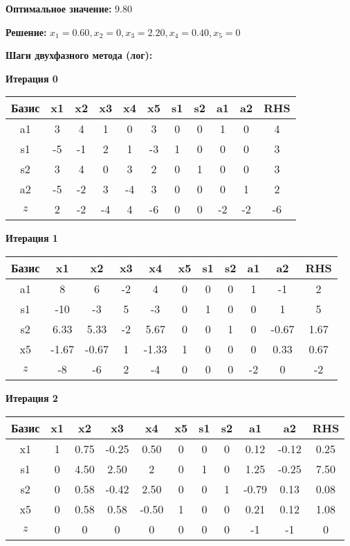 \documentclass[a4paper,12pt]{article}
\begin{document}
\textbf{Оптимальное значение: }$9.80$

\textbf{Решение: }$x_{1}=0.60, x_{2}=0, x_{3}=2.20, x_{4}=0.40, x_{5}=0$

\textbf{Шаги двухфазного метода (лог):}


 \textbf{Итерация 0}\\
\begin{tabular}{|c|c|c|c|c|c|c|c|c|c|c|}
\hline
Базис & x1 & x2 & x3 & x4 & x5 & s1 & s2 & a1 & a2 & RHS \\ \hline
a1 & 3 & 4 & 1 & 0 & 3 & 0 & 0 & 1 & 0 & 4 \\ \hline
s1 & -5 & -1 & 2 & 1 & -3 & 1 & 0 & 0 & 0 & 3 \\ \hline
s2 & 3 & 4 & 0 & 3 & 2 & 0 & 1 & 0 & 0 & 3 \\ \hline
a2 & -5 & -2 & 3 & -4 & 3 & 0 & 0 & 0 & 1 & 2 \\ \hline
$z$ & 2 & -2 & -4 & 4 & -6 & 0 & 0 & -2 & -2 & -6 \\ \hline
\end{tabular}
\vspace{5mm}

 \textbf{Итерация 1}\\
\begin{tabular}{|c|c|c|c|c|c|c|c|c|c|c|}
\hline
Базис & x1 & x2 & x3 & x4 & x5 & s1 & s2 & a1 & a2 & RHS \\ \hline
a1 & 8 & 6 & -2 & 4 & 0 & 0 & 0 & 1 & -1 & 2 \\ \hline
s1 & -10 & -3 & 5 & -3 & 0 & 1 & 0 & 0 & 1 & 5 \\ \hline
s2 & 6.33 & 5.33 & -2 & 5.67 & 0 & 0 & 1 & 0 & -0.67 & 1.67 \\ \hline
x5 & -1.67 & -0.67 & 1 & -1.33 & 1 & 0 & 0 & 0 & 0.33 & 0.67 \\ \hline
$z$ & -8 & -6 & 2 & -4 & 0 & 0 & 0 & -2 & 0 & -2 \\ \hline
\end{tabular}
\vspace{5mm}

 \textbf{Итерация 2}\\
\begin{tabular}{|c|c|c|c|c|c|c|c|c|c|c|}
\hline
Базис & x1 & x2 & x3 & x4 & x5 & s1 & s2 & a1 & a2 & RHS \\ \hline
x1 & 1 & 0.75 & -0.25 & 0.50 & 0 & 0 & 0 & 0.12 & -0.12 & 0.25 \\ \hline
s1 & 0 & 4.50 & 2.50 & 2 & 0 & 1 & 0 & 1.25 & -0.25 & 7.50 \\ \hline
s2 & 0 & 0.58 & -0.42 & 2.50 & 0 & 0 & 1 & -0.79 & 0.13 & 0.08 \\ \hline
x5 & 0 & 0.58 & 0.58 & -0.50 & 1 & 0 & 0 & 0.21 & 0.12 & 1.08 \\ \hline
$z$ & 0 & 0 & 0 & 0 & 0 & 0 & 0 & -1 & -1 & 0 \\ \hline
\end{tabular}
\vspace{5mm}
\end{document}
